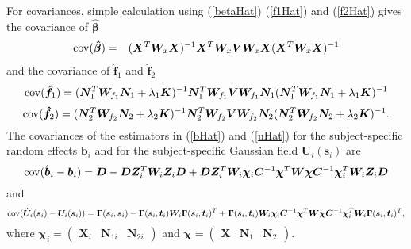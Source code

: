 \documentclass[article,lineno]{biometrika}
\begin{document}
  
For covariances, simple calculation using (\ref{betaHat}) (\ref{f1Hat}) and (\ref{f2Hat}) gives the covariance of $\boldsymbol {\hat \beta}$  
\begin{eqnarray*}
{\rm cov}(\boldsymbol {\hat \beta}) 
&=&
(\boldsymbol X^T  \boldsymbol W_x \boldsymbol X )^{-1} \boldsymbol X^T  \boldsymbol W_x 
\boldsymbol V 
\boldsymbol W_x \boldsymbol X (\boldsymbol X^T  \boldsymbol W_x \boldsymbol X )^{-1} 
\end{eqnarray*}
and the covariance of $\boldsymbol {\hat f}_1$  and $\boldsymbol {\hat f}_2$
$$
{\rm cov}(\boldsymbol {\hat f}_1) 
=
(\boldsymbol N_1^T 
\boldsymbol W_{f_1}  \boldsymbol N_1
  + \lambda_1 \boldsymbol K)^{-1}  \boldsymbol N_1^T \boldsymbol W_{f_1}
   \boldsymbol V 
\boldsymbol W_{f_1} \boldsymbol N_1
(\boldsymbol N_1^T 
\boldsymbol W_{f_1}  \boldsymbol N_1
  + \lambda_1 \boldsymbol K)^{-1}
$$
$$
{\rm cov}(\boldsymbol {\hat f}_2) 
=
(\boldsymbol N_2^T \boldsymbol W_{f_2}  \boldsymbol N_2 + \lambda_2 \boldsymbol K)^{-1} 
\boldsymbol N_2^T \boldsymbol W_{f_2} 
   \boldsymbol V 
\boldsymbol W_{f_2} \boldsymbol N_2
(\boldsymbol N_2^T \boldsymbol W_{f_2}  \boldsymbol N_2 + \lambda_2 \boldsymbol K)^{-1}.
$$
The covariances of the estimators in (\ref{bHat}) and (\ref{uHat}) for the subject-specific random effects $\boldsymbol b_i$ and for the subject-specific Gaussian field $\boldsymbol U_i(\boldsymbol s_i)$
 are  
 \begin{equation}
 \label{covIn}
{\rm cov}(\hat{\boldsymbol b}_i - \boldsymbol b_i) 
= \boldsymbol D 
-
\boldsymbol D \boldsymbol Z_i^T \boldsymbol W_i  \boldsymbol Z_i  \boldsymbol D 
+
\boldsymbol D \boldsymbol Z_i^T \boldsymbol W_i
\boldsymbol \chi_i  \boldsymbol C^{-1} \boldsymbol \chi^T
\boldsymbol W
\boldsymbol \chi  \boldsymbol C^{-1} \boldsymbol \chi_i^T
\boldsymbol  W_i \boldsymbol Z_i \boldsymbol D
\end{equation}
and 
$$
{\rm cov}(\hat{\boldsymbol U}_i (\boldsymbol s_i) - \boldsymbol U_i (\boldsymbol s_i) ) 
= \boldsymbol \Gamma(\boldsymbol s_i, \boldsymbol s_i) 
-
\boldsymbol \Gamma(\boldsymbol s_i, \boldsymbol t_i) 
\boldsymbol W_i  
\boldsymbol \Gamma(\boldsymbol s_i, \boldsymbol t_i)^T 
+
\boldsymbol \Gamma(\boldsymbol s_i, \boldsymbol t_i) \boldsymbol W_i
\boldsymbol \chi_i  \boldsymbol C^{-1} \boldsymbol \chi^T
\boldsymbol W
\boldsymbol \chi  \boldsymbol C^{-1} \boldsymbol \chi_i^T
\boldsymbol  W_i \boldsymbol \Gamma(\boldsymbol s_i, \boldsymbol t_i)^T,
$$
where 
$
\boldsymbol \chi_i 
=
\begin{pmatrix}
\boldsymbol X_i & \boldsymbol N_{1i} & \boldsymbol N_{2i}
\end{pmatrix}
$
and
$
\boldsymbol \chi 
=
\begin{pmatrix}
\boldsymbol X & \boldsymbol N_1 & \boldsymbol N_2
\end{pmatrix}.
$
\end{document}
